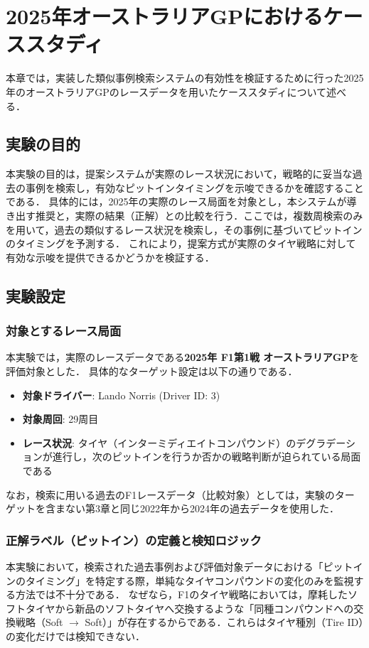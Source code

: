 \documentclass{deimj}
\begin{document}
\section{2025年オーストラリアGPにおけるケーススタディ}
\label{sec:experiment}

本章では，実装した類似事例検索システムの有効性を検証するために行った2025年のオーストラリアGPのレースデータを用いたケーススタディについて述べる．

\subsection{実験の目的}
本実験の目的は，提案システムが実際のレース状況において，戦略的に妥当な過去の事例を検索し，有効なピットインタイミングを示唆できるかを確認することである．
具体的には，2025年の実際のレース局面を対象とし，本システムが導き出す推奨と，実際の結果（正解）との比較を行う．ここでは，複数周検索のみを用いて，過去の類似するレース状況を検索し，その事例に基づいてピットインのタイミングを予測する．
これにより，提案方式が実際のタイヤ戦略に対して有効な示唆を提供できるかどうかを検証する．

\subsection{実験設定}

\subsubsection{対象とするレース局面}
本実験では，実際のレースデータである\textbf{2025年 F1第1戦 オーストラリアGP}を評価対象とした．
具体的なターゲット設定は以下の通りである．

\begin{itemize}
  \item \textbf{対象ドライバー}: Lando Norris (Driver ID: 3)
  \item \textbf{対象周回}: 29周目
  \item \textbf{レース状況}: タイヤ（インターミディエイトコンパウンド）のデグラデーションが進行し，次のピットインを行うか否かの戦略判断が迫られている局面である
\end{itemize}
なお，検索に用いる過去のF1レースデータ（比較対象）としては，実験のターゲットを含まない第3章と同じ2022年から2024年の過去データを使用した．

\subsubsection{正解ラベル（ピットイン）の定義と検知ロジック}
本実験において，検索された過去事例および評価対象データにおける「ピットインのタイミング」を特定する際，単純なタイヤコンパウンドの変化のみを監視する方法では不十分である．
なぜなら，F1のタイヤ戦略においては，摩耗したソフトタイヤから新品のソフトタイヤへ交換するような「同種コンパウンドへの交換戦略（Soft $\to$ Soft）」が存在するからである．これらはタイヤ種別（Tire ID）の変化だけでは検知できない．
\end{document}
